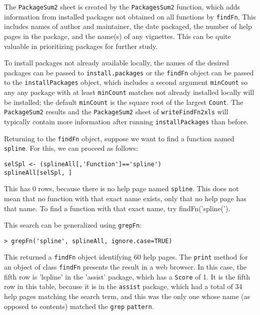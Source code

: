 The {\tt PackageSum2} sheet is created by the
{\tt PackagesSum2} function, which adds information from
installed packages not obtained on all functions by
{\tt findFn}.  This includes names of author and maintainer,
the date packaged, the number of help pages in the package,
and the name(s) of any vignettes.  This can be quite
valuable in prioritizing packages for further study.

To install packages not already available locally,
the names of the desired packages can be passed to
{\tt install.packages} or the {\tt findFn} object can be
passed to the {\tt installPackages} object, which includes
a second argument {\tt minCount} so any any package with
at least {\tt minCount} matches not already installed
locally will be installed;  the default {\tt minCount}
is the square root of the largest {\tt Count}.  The
{\tt PackageSum2} results and the {\tt PackageSum2}
sheet of {\tt writeFindFn2xls} will typically contain
more information after running {\tt installPackages}
than before.

Returning to the {\tt findFn} object, suppose we want
to find a function named {\tt spline}.  For this, we can
proceed as follows:
\begin{verbatim}
selSpl <- (splineAll[,'Function']=='spline')
splineAll[selSpl, ]
\end{verbatim}
This has 0 rows, because there is no help page named
{\tt spline}.  This does not mean that no function
with that exact name exists, only that no help page
has that name.  To find a function with that exact
name, try {findFn('spline(')}.

This search can be generalized using {\tt grepFn}:
\begin{verbatim}
> grepFn('spline', splineAll, ignore.case=TRUE)
\end{verbatim}
This returned a {\tt findFn} object identifying 60 help pages.
The {\tt print} method for an object of class {\tt findFn}
presents the result in a web browser.  In this case,
the fifth row is 'lspline' in the
'assist' package, which has a {\tt Score} of 1.  It
is the fifth row in this table, because it is in the
{\tt assist} package, which had a total of 34 help
pages matching the search term, and this was the only
one whose name (as opposed to contents) matched the
{\tt grep} {\tt pattern}.








